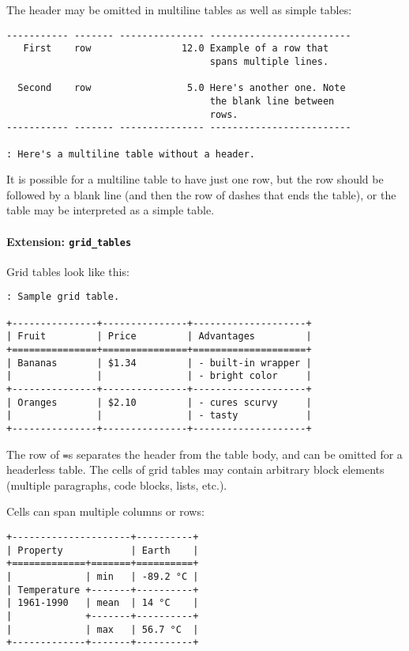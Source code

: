 \documentclass[
  a4paper,
]{article}
\begin{document}
The header may be omitted in multiline tables as well as simple tables:

\begin{verbatim}
----------- ------- --------------- -------------------------
   First    row                12.0 Example of a row that
                                    spans multiple lines.

  Second    row                 5.0 Here's another one. Note
                                    the blank line between
                                    rows.
----------- ------- --------------- -------------------------

: Here's a multiline table without a header.
\end{verbatim}

It is possible for a multiline table to have just one row, but the row
should be followed by a blank line (and then the row of dashes that ends
the table), or the table may be interpreted as a simple table.

\hypertarget{extension-grid_tables}{%
\paragraph{\texorpdfstring{Extension:
\texttt{grid\_tables}}{Extension: grid\_tables}}\label{extension-grid_tables}}

Grid tables look like this:

\begin{verbatim}
: Sample grid table.

+---------------+---------------+--------------------+
| Fruit         | Price         | Advantages         |
+===============+===============+====================+
| Bananas       | $1.34         | - built-in wrapper |
|               |               | - bright color     |
+---------------+---------------+--------------------+
| Oranges       | $2.10         | - cures scurvy     |
|               |               | - tasty            |
+---------------+---------------+--------------------+
\end{verbatim}

The row of \texttt{=}s separates the header from the table body, and can
be omitted for a headerless table. The cells of grid tables may contain
arbitrary block elements (multiple paragraphs, code blocks, lists,
etc.).

Cells can span multiple columns or rows:

\begin{verbatim}
+---------------------+----------+
| Property            | Earth    |
+=============+=======+==========+
|             | min   | -89.2 °C |
| Temperature +-------+----------+
| 1961-1990   | mean  | 14 °C    |
|             +-------+----------+
|             | max   | 56.7 °C  |
+-------------+-------+----------+
\end{verbatim}
\end{document}
